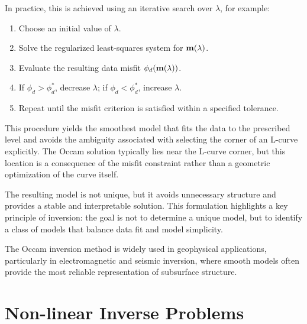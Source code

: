 In practice, this is achieved using an iterative search over $\lambda$, for example:
\begin{enumerate}
    \item Choose an initial value of $\lambda$.
    \item Solve the regularized least-squares system for $\vb{m}(\lambda)$.
    \item Evaluate the resulting data misfit $\phi_d(\vb{m}(\lambda))$.
    \item If $\phi_d > \phi_d^*$, decrease $\lambda$; if $\phi_d < \phi_d^*$, increase $\lambda$.
    \item Repeat until the misfit criterion is satisfied within a specified tolerance.
\end{enumerate}

This procedure yields the smoothest model that fits the data to the prescribed level and avoids the ambiguity associated with selecting the corner of an L-curve explicitly. The Occam solution typically lies near the L-curve corner, but this location is a consequence of the misfit constraint rather than a geometric optimization of the curve itself.

The resulting model is not unique, but it avoids unnecessary structure and provides a stable and interpretable solution. This formulation highlights a key principle of inversion: the goal is not to determine a unique model, but to identify a class of models that balance data fit and model simplicity.

The Occam inversion method is widely used in geophysical applications, particularly in electromagnetic and seismic inversion, where smooth models often provide the most reliable representation of subsurface structure.


\section{Non-linear Inverse Problems}

